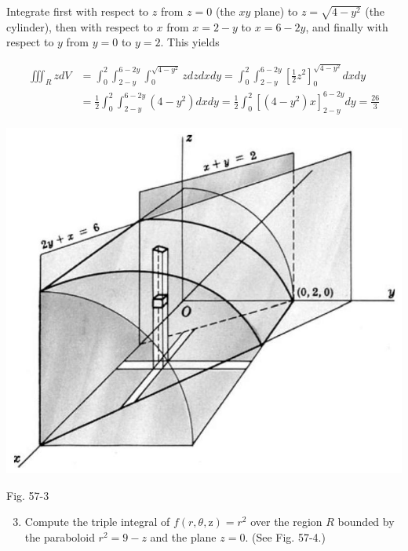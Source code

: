 \documentclass[10pt]{article}
\begin{document}
Integrate first with respect to $z$ from $z=0$ (the $x y$ plane) to $z=\sqrt{4-y^{2}}$ (the cylinder), then with respect to $x$ from $x=2-y$ to $x=6-2 y$, and finally with respect to $y$ from $y=0$ to $y=2$. This yields

$$
\begin{aligned}
\iiint_{R} z d V & =\int_{0}^{2} \int_{2-y}^{6-2 y} \int_{0}^{\sqrt{4-y^{2}}} z d z d x d y=\int_{0}^{2} \int_{2-y}^{6-2 y}\left[\frac{1}{2} z^{2}\right]_{0}^{\sqrt{4-y^{2}}} d x d y \\
& =\frac{1}{2} \int_{0}^{2} \int_{2-y}^{6-2 y}\left(4-y^{2}\right) d x d y=\frac{1}{2} \int_{0}^{2}\left[\left(4-y^{2}\right) x\right]_{2-y}^{6-2 y} d y=\frac{26}{3}
\end{aligned}
$$

\begin{center}
\includegraphics[max width=\textwidth]{2024_04_20_fe2e8e718cc0fcd63d1bg-03(1)}
\end{center}

Fig. 57-3

\begin{enumerate}
  \setcounter{enumi}{2}
  \item Compute the triple integral of $f(r, \theta, \mathrm{z})=r^{2}$ over the region $R$ bounded by the paraboloid $r^{2}=9-z$ and the plane $z=0$. (See Fig. 57-4.)
\end{enumerate}
\end{document}
